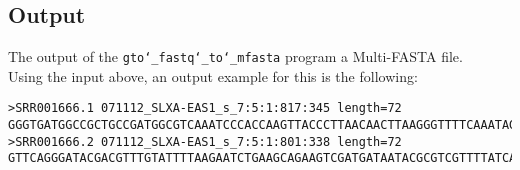 \subsection*{Output}
The output of the \texttt{gto\char`_fastq\char`_to\char`_mfasta} program a Multi-FASTA file.\\
Using the input above, an output example for this is the following:
\begin{lstlisting}
>SRR001666.1 071112_SLXA-EAS1_s_7:5:1:817:345 length=72
GGGTGATGGCCGCTGCCGATGGCGTCAAATCCCACCAAGTTACCCTTAACAACTTAAGGGTTTTCAAATAGA
>SRR001666.2 071112_SLXA-EAS1_s_7:5:1:801:338 length=72
GTTCAGGGATACGACGTTTGTATTTTAAGAATCTGAAGCAGAAGTCGATGATAATACGCGTCGTTTTATCAT
\end{lstlisting}
